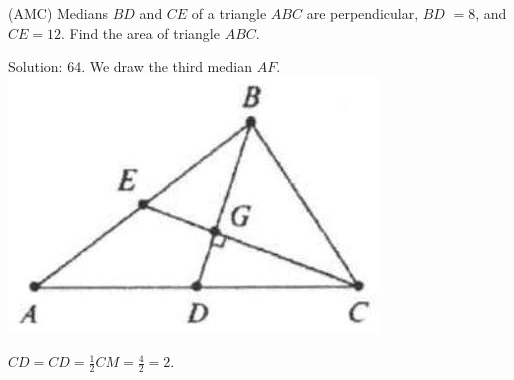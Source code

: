 \documentclass{article}
\begin{document}
(AMC) Medians \(B D\) and \(C E\) of a triangle \(A B C\) are perpendicular, \(B D\) \(=8\), and \(C E=12\). Find the area of triangle \(A B C\).

Solution: 64.
We draw the third median \(A F\).\\
\centering
\includegraphics[width=\textwidth]{images/010(3).jpg}


\(C D=C D=\frac{1}{2} C M=\frac{4}{2}=2\).
\end{document}
